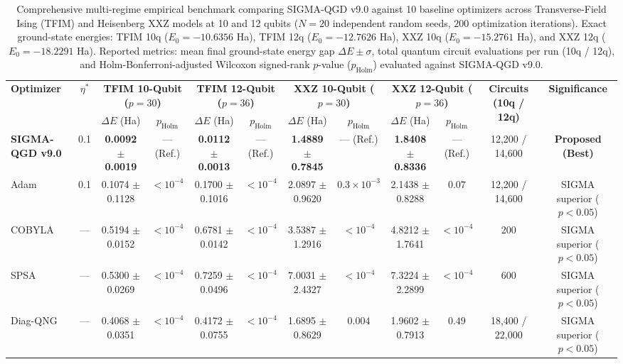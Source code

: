 \begin{table}[t]
\centering
\small
\caption{Comprehensive multi-regime empirical benchmark comparing SIGMA-QGD v9.0 against 10 baseline optimizers across Transverse-Field Ising (TFIM) and Heisenberg XXZ models at 10 and 12 qubits ($N=20$ independent random seeds, $200$ optimization iterations). Exact ground-state energies: TFIM 10q ($E_0 = -10.6356$ Ha), TFIM 12q ($E_0 = -12.7626$ Ha), XXZ 10q ($E_0 = -15.2761$ Ha), and XXZ 12q ($E_0 = -18.2291$ Ha). Reported metrics: mean final ground-state energy gap $\Delta E \pm \sigma$, total quantum circuit evaluations per run (10q / 12q), and Holm-Bonferroni-adjusted Wilcoxon signed-rank $p$-value ($p_{\text{Holm}}$) evaluated against SIGMA-QGD v9.0.}
\label{tab:main_benchmark_consolidated}
\begin{tabular}{lccccccccccc}
\toprule
\multirow{2}{*}{\textbf{Optimizer}} & \multirow{2}{*}{$\eta^*$} & \multicolumn{2}{c}{\textbf{TFIM 10-Qubit ($p=30$)}} & \multicolumn{2}{c}{\textbf{TFIM 12-Qubit ($p=36$)}} & \multicolumn{2}{c}{\textbf{XXZ 10-Qubit ($p=30$)}} & \multicolumn{2}{c}{\textbf{XXZ 12-Qubit ($p=36$)}} & \multirow{2}{*}{\textbf{Circuits (10q / 12q)}} & \multirow{2}{*}{\textbf{Significance}} \\
\cmidrule(lr){3-4} \cmidrule(lr){5-6} \cmidrule(lr){7-8} \cmidrule(lr){9-10}
& & $\Delta E$ (Ha) & $p_{\text{Holm}}$ & $\Delta E$ (Ha) & $p_{\text{Holm}}$ & $\Delta E$ (Ha) & $p_{\text{Holm}}$ & $\Delta E$ (Ha) & $p_{\text{Holm}}$ & & \\
\midrule
\textbf{SIGMA-QGD v9.0} & 0.1 & \textbf{0.0092 $\pm$ 0.0019} & --- (Ref.) & \textbf{0.0112 $\pm$ 0.0013} & --- (Ref.) & \textbf{1.4889 $\pm$ 0.7845} & --- (Ref.) & \textbf{1.8408 $\pm$ 0.8336} & --- (Ref.) & 12,200 / 14,600 & \textbf{Proposed (Best)} \\
Adam & 0.1 & 0.1074 $\pm$ 0.1128 & $< 10^{-4}$ & 0.1700 $\pm$ 0.1016 & $< 10^{-4}$ & 2.0897 $\pm$ 0.9620 & $0.3 \times 10^{-3}$ & 2.1438 $\pm$ 0.8288 & $0.07$ & 12,200 / 14,600 & SIGMA superior ($p<0.05$) \\
COBYLA & --- & 0.5194 $\pm$ 0.0152 & $< 10^{-4}$ & 0.6781 $\pm$ 0.0142 & $< 10^{-4}$ & 3.5387 $\pm$ 1.2916 & $< 10^{-4}$ & 4.8212 $\pm$ 1.7641 & $< 10^{-4}$ & 200 & SIGMA superior ($p<0.05$) \\
SPSA & --- & 0.5300 $\pm$ 0.0269 & $< 10^{-4}$ & 0.7259 $\pm$ 0.0496 & $< 10^{-4}$ & 7.0031 $\pm$ 2.4327 & $< 10^{-4}$ & 7.3224 $\pm$ 2.2899 & $< 10^{-4}$ & 600 & SIGMA superior ($p<0.05$) \\
Diag-QNG & --- & 0.4068 $\pm$ 0.0351 & $< 10^{-4}$ & 0.4172 $\pm$ 0.0755 & $< 10^{-4}$ & 1.6895 $\pm$ 0.8629 & $0.004$ & 1.9602 $\pm$ 0.7913 & $0.49$ & 18,400 / 22,000 & SIGMA superior ($p<0.05$) \\

\end{tabular}
\end{table}
